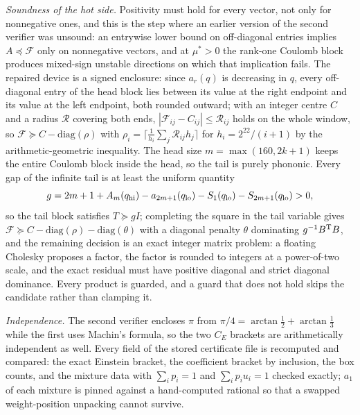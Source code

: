 \documentclass[11pt]{article}
\newcommand{\Fcal}{\mathcal F}
\newcommand{\muS}{\mu^{*}}
\theoremstyle{definition}
\theoremstyle{remark}
\begin{document}
\emph{Soundness of the hot side.} Positivity must hold for every vector, not only for
nonnegative ones, and this is the step where an earlier version of the second verifier was
unsound: an entrywise lower bound on off-diagonal entries implies $A\preceq\Fcal$ only on
nonnegative vectors, and at $\muS>0$ the rank-one Coulomb block produces mixed-sign
unstable directions on which that implication fails. The repaired device is a signed
enclosure: since $a_r(q)$ is decreasing in $q$, every off-diagonal entry of the head block
lies between its value at the right endpoint and its value at the left endpoint, both
rounded outward; with an integer centre $C$ and a radius $\mathcal R$ covering both ends,
$|\Fcal_{ij}-C_{ij}|\le\mathcal R_{ij}$ holds on the whole window, so
$\Fcal\succeq C-\mathrm{diag}(\rho)$ with $\rho_i=\lceil\frac1{h_i}\sum_j\mathcal
R_{ij}h_j\rceil$ for $h_i=2^{22}/(i+1)$ by the arithmetic-geometric inequality. The head
size $m=\max(160,2k+1)$ keeps the entire Coulomb block inside the head, so the tail is
purely phononic. Every gap of the infinite tail is at least the uniform quantity
\begin{equation}\label{eq:gap}
g=2m+1+A_m(q_{\rm hi})-a_{2m+1}(q_{\rm lo})-S_1(q_{\rm lo})-S_{2m+1}(q_{\rm lo})>0,
\end{equation}
so the tail block satisfies $T\succeq gI$; completing the square in the tail variable gives
$\Fcal\succeq C-\mathrm{diag}(\rho)-\mathrm{diag}(\theta)$ with a diagonal penalty
$\theta$ dominating $g^{-1}B^{\rm T}B$, and the remaining decision is an exact integer
matrix problem: a floating Cholesky proposes a factor, the factor is rounded to integers at
a power-of-two scale, and the exact residual must have positive diagonal and strict
diagonal dominance. Every product is guarded, and a guard that does not hold skips the
candidate rather than clamping it.

\emph{Independence.} The second verifier encloses $\pi$ from
$\pi/4=\arctan\frac12+\arctan\frac13$ while the first uses Machin's formula, so the two
$C_E$ brackets are arithmetically independent as well. Every field of the stored
certificate file is recomputed and compared: the exact Einstein bracket, the coefficient
bracket by inclusion, the box counts, and the mixture data with $\sum_ip_i=1$ and
$\sum_ip_iu_i=1$ checked exactly; $a_1$ of each mixture is pinned against a hand-computed
rational so that a swapped weight-position unpacking cannot survive.
\end{document}
